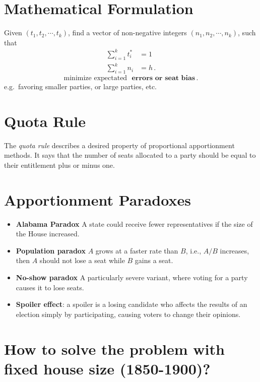 \documentclass[
  letterpaper,
  DIV=11,
  numbers=noendperiod]{scrreprt}
\begin{document}
\section{Mathematical Formulation}\label{mathematical-formulation}

Given \((t_1,t_2,\cdots, t_k)\), find a vector of non-negative integers
\((n_1,n_2,\cdots, n_k)\), such that \[
\begin{aligned}
\sum_{i=1}^k{t^*_i}&=1\\
\sum_{i=1}^k n_i &=h\,.
\end{aligned}
\] \[\text{minimize expectated } \textbf{ errors or seat bias}\,.\]
e.g.~favoring smaller parties, or large parties, etc.

\section{Quota Rule}\label{quota-rule}

The \emph{quota rule} describes a desired property of proportional
apportionment methods. It says that the number of seats allocated to a
party should be equal to their entitlement plus or minus one.

\section{Apportionment Paradoxes}\label{apportionment-paradoxes}

\begin{itemize}
\item
  \textbf{Alabama Paradox} A state could receive fewer representatives
  if the size of the House increased.
\item
  \textbf{Population paradox} \(A\) grows at a faster rate than \(B\),
  i.e., \({ A/B}\) increases, then \({ A}\) should not lose a seat while
  \({B}\) gains a seat.
\item
  \textbf{No-show paradox} A particularly severe variant, where voting
  for a party causes it to lose seats.
\item
  \textbf{Spoiler effect}: a spoiler is a losing candidate who affects
  the results of an election simply by participating, causing voters to
  change their opinions.
\end{itemize}

\section{How to solve the problem with fixed house size
(1850-1900)?}\label{how-to-solve-the-problem-with-fixed-house-size-1850-1900}
\end{document}
